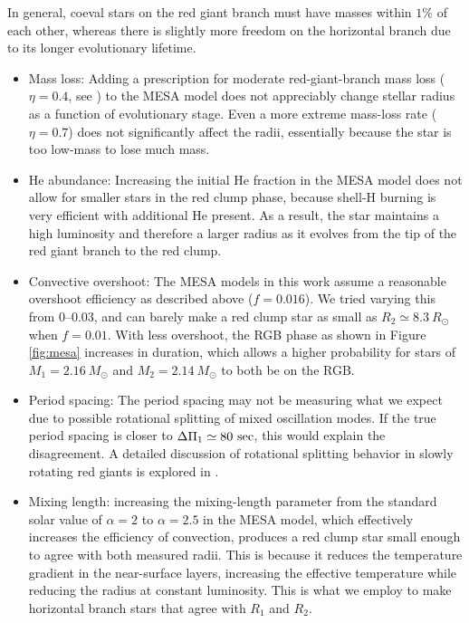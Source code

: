 In general, coeval stars on the red giant branch must have masses within $1\%$ of each other, whereas there is slightly more freedom on the horizontal branch due to its longer evolutionary lifetime. 
\begin{itemize}
\item Mass loss: Adding a prescription for moderate red-giant-branch mass loss ($\eta = 0.4$, see \citealt{mig12}) to the MESA model does not appreciably change stellar radius as a function of evolutionary stage. Even a more extreme mass-loss rate ($\eta = 0.7$) does not significantly affect the radii, essentially because the star is too low-mass to lose much mass.
\item He abundance: Increasing the initial He fraction in the MESA model does not allow for smaller stars in the red clump phase, because shell-H burning is very efficient with additional He present. As a result, the star maintains a high luminosity and therefore a larger radius as it evolves from the tip of the red giant branch to the red clump.
\item Convective overshoot: The MESA models in this work assume a reasonable overshoot efficiency as described above ($f = 0.016$). We tried varying this from 0--0.03, and can barely make a red clump star as small as $R_2 \simeq 8.3 \ R_\odot$ when $f = 0.01$. With less overshoot, the RGB phase as shown in Figure \ref{fig:mesa} increases in duration, which allows a higher probability for stars of $M_1 = 2.16 \ M_\odot$ and $M_2 = 2.14 \ M_\odot$ to both be on the RGB.
\item Period spacing: The period spacing  may not be measuring what we expect due to possible rotational splitting of mixed oscillation modes. If the true period spacing is closer to $\Delta \Pi_1 \simeq 80 \ \rm{sec}$, this would explain the disagreement. A detailed discussion of rotational splitting behavior in slowly rotating red giants is explored in \citet{gou13}.
\item Mixing length:  increasing the mixing-length parameter from the standard solar value of $\alpha = 2$ to $\alpha = 2.5$ in the MESA model, which effectively increases the efficiency of convection, produces a red clump star small enough to agree with both measured radii. This is because it reduces the temperature gradient in the near-surface layers, increasing the effective temperature while reducing the radius at constant luminosity. This is what we employ to make horizontal branch stars that agree with $R_1$ and $R_2$.
\end{itemize}
